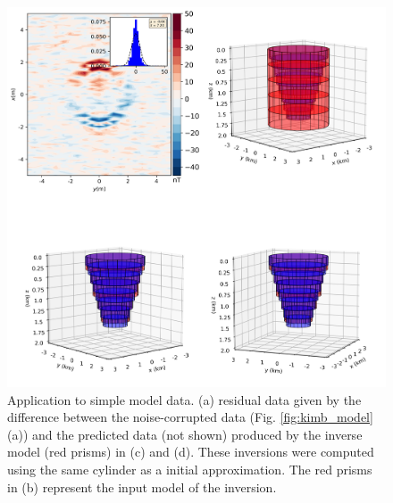 \begin{figure}
	\centering
	\includegraphics[scale=.5]{figures/wedding_cake_results.png}
	\caption{Application to simple model data. (a) residual data given by the difference between the noise-corrupted data (Fig. \ref{fig:kimb_model}(a)) and the predicted data (not shown) produced by the inverse model (red prisms) in (c) and (d). These inversions were computed using the same cylinder as a initial approximation. The red prisms in (b) represent the input model of the inversion.
	}
	\label{fig:kimb_results}
\end{figure}

